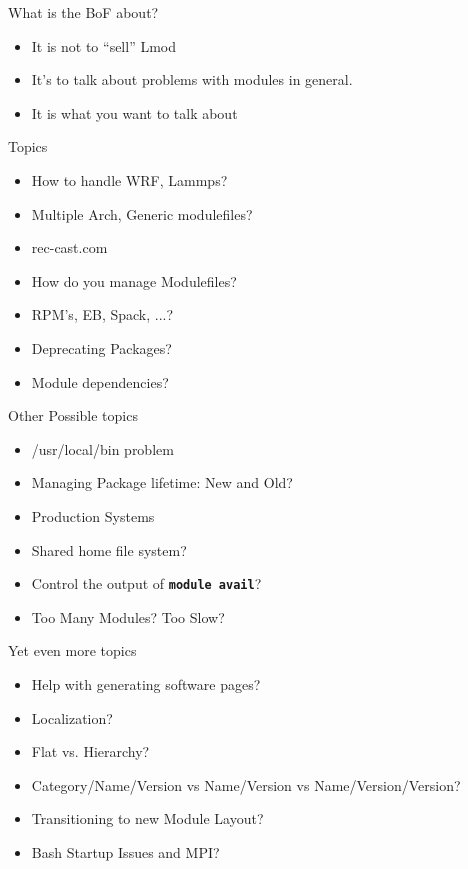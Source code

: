 \documentclass{beamer}
\begin{document}
\begin{frame}{What is the BoF about?}
  \begin{itemize}
    \item It is not to ``sell'' Lmod
    \item It's to talk about problems with modules in general.
    \item It is what you want to talk about
  \end{itemize}
\end{frame}


\begin{frame}{Topics}
  \begin{itemize}
    \item How to handle WRF, Lammps?
    \item Multiple Arch, Generic modulefiles?
    \item rec-cast.com
    \item How do you manage Modulefiles?
    \item RPM's, EB, Spack, ...?
    \item Deprecating Packages?
    \item Module dependencies?
  \end{itemize}
\end{frame}

\begin{frame}{Other Possible topics}
  \begin{itemize}
    \item /usr/local/bin problem
    \item Managing Package lifetime: New and Old?
    \item Production Systems
    \item Shared home file system?
    \item Control the output of \texttt{\bf module avail}?
    \item Too Many Modules? Too Slow?
  \end{itemize}
\end{frame}


\begin{frame}{Yet even more topics}
  \begin{itemize}
    \item Help with generating software pages?
    \item Localization?
    \item Flat vs. Hierarchy?
    \item Category/Name/Version vs Name/Version vs
      Name/Version/Version?
    \item Transitioning to new Module Layout?
    \item Bash Startup Issues and MPI?
  \end{itemize}
\end{frame}
\end{document}
